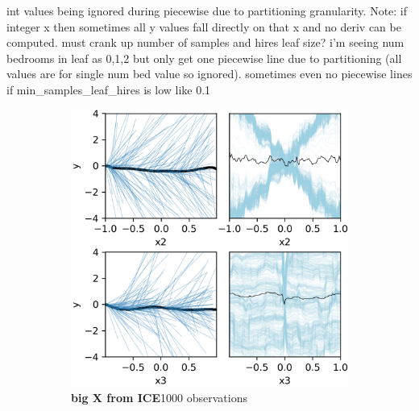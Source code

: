 \documentclass[12pt]{article}
\begin{document}
int values being ignored during piecewise due to partitioning granularity. Note: if integer x then sometimes all y values fall directly on that x and no deriv can be computed.  must crank up number of samples and hires leaf size? i'm seeing num bedrooms in leaf as 0,1,2 but only get one piecewise line due to partitioning (all values are for single num bed value so ignored). sometimes even no piecewise lines if min\_samples\_leaf\_hires is low like 0.1

\begin{figure}[htbp]
\begin{subfigure}[h]{0.495\textwidth}
\includegraphics[scale=0.7]{images/bigx.png}
\caption{{\bf big X from ICE}1000 observations}
\label{fig:bigx_stratpd}
\end{subfigure}
\begin{subfigure}[h]{0.495\textwidth}

\end{subfigure}
\end{figure}
\end{document}
